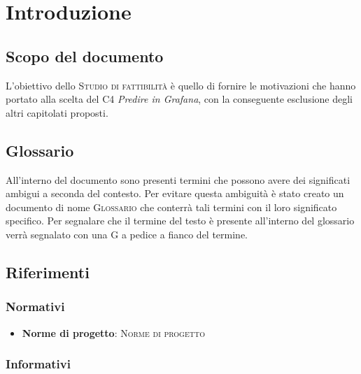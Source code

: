 \documentclass{article}
\begin{document}


\section{Introduzione}%
\label{sec:introduzione}

\subsection{Scopo del documento}%
\label{sub:scopo_del_documento}
L'obiettivo dello \textsc{Studio di fattibilità} è quello di fornire le motivazioni che hanno portato alla scelta del  C4 \emph{Predire in Grafana}, con la conseguente esclusione degli altri capitolati proposti.

\subsection{Glossario}%
\label{sub:glossario}
All'interno del documento sono presenti termini che possono avere dei significati ambigui a seconda del contesto. Per evitare questa ambiguità è stato creato un documento di nome \textsc{Glossario} che conterrà tali termini con il loro significato specifico. Per segnalare che il termine del testo è presente all'interno del glossario verrà segnalato con una G a pedice a fianco del termine.

\subsection{Riferimenti}%
\label{sub:riferimenti}

\subsubsection{Normativi}%
\label{subs:normativi}

\begin{itemize}
  \item \textbf{Norme di progetto}: \textsc{Norme di progetto}
\end{itemize}

\subsubsection{Informativi}%
\label{subs:informativi}
\end{document}
